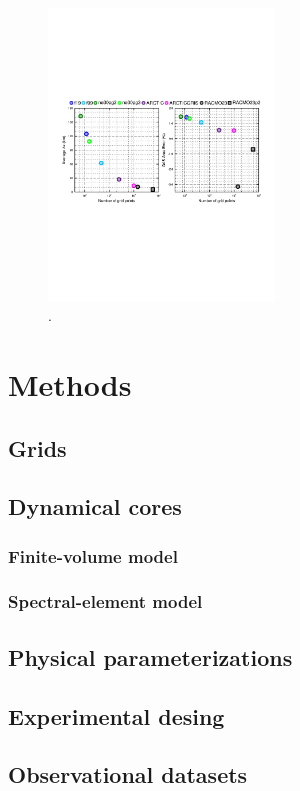 \documentclass[draft]{agujournal2019}
\begin{document}
\begin{figure}[t]
\begin{center}
         \includegraphics[width=60mm]{figs/temp_grisres.pdf}
\end{center}
\caption{.}
\label{fig:prect}
\end{figure}

\section{Methods}\label{sec:methods}
\subsection{Grids}
\subsection{Dynamical cores}
\subsubsection{Finite-volume model}
\subsubsection{Spectral-element model}
\subsection{Physical parameterizations}
\subsection{Experimental desing}
\subsection{Observational datasets}
\end{document}
